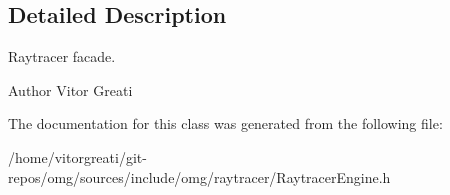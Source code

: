 \subsection{Detailed Description}
Raytracer facade. 

\begin{DoxyAuthor}{Author}
Vitor Greati 
\end{DoxyAuthor}


The documentation for this class was generated from the following file\+:\begin{DoxyCompactItemize}
\item 
/home/vitorgreati/git-\/repos/omg/sources/include/omg/raytracer/Raytracer\+Engine.\+h\end{DoxyCompactItemize}
